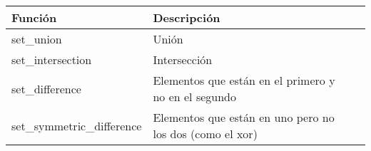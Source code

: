 \begin{tabular}{|l|l|p{9cm}|} \hline
\textbf{Función}               & \textbf{Descripción}                                     \\ \hline
    set\_union                 & Unión                                                    \\ \hline
    set\_intersection          & Intersección                                             \\ \hline
    set\_difference            & Elementos que están en el primero y no en el segundo     \\ \hline
    set\_symmetric\_difference & Elementos que están en uno pero no los dos (como el xor) \\ \hline
\end{tabular}